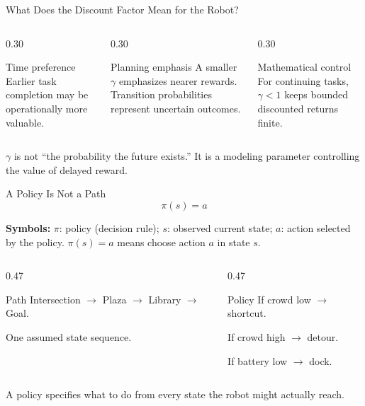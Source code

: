 \documentclass[aspectratio=169,10pt]{beamer}
\newcommand{\equationlegend}[1]{%
  \par\smallskip
  \begingroup
    \setlength{\fboxsep}{4pt}%
    \noindent\colorbox{DeckSoft}{%
      \parbox{\dimexpr\linewidth-2\fboxsep\relax}{%
        \footnotesize\textbf{Symbols:} #1%
      }%
    }\par
  \endgroup
  \smallskip
}
\begin{document}
\begin{frame}[shrink=10]{What Does the Discount Factor Mean for the Robot?}
  \begin{columns}[T,onlytextwidth]
    \begin{column}{0.30\textwidth}
      \begin{block}{Time preference}
        Earlier task completion may be operationally more valuable.
      \end{block}
    \end{column}
    \begin{column}{0.30\textwidth}
      \begin{block}{Planning emphasis}
        A smaller $\gamma$ emphasizes nearer rewards. Transition probabilities represent uncertain outcomes.
      \end{block}
    \end{column}
    \begin{column}{0.30\textwidth}
      \begin{block}{Mathematical control}
        For continuing tasks, $\gamma<1$ keeps bounded discounted returns finite.
      \end{block}
    \end{column}
  \end{columns}

  \begin{keyidea}
    $\gamma$ is not ``the probability the future exists.'' It is a modeling parameter controlling the value of delayed reward.
  \end{keyidea}
\end{frame}

\begin{frame}[shrink=10]{A Policy Is Not a Path}
  \[
    \pi(s)=a
  \]
  \equationlegend{$\pi$: policy (decision rule); $s$: observed current state; $a$: action selected by the policy. $\pi(s)=a$ means choose action $a$ in state $s$.}

  \begin{columns}[T,onlytextwidth]
    \begin{column}{0.47\textwidth}
      \begin{block}{Path}
        Intersection $\rightarrow$ Plaza $\rightarrow$ Library $\rightarrow$ Goal.

        One assumed state sequence.
      \end{block}
    \end{column}
    \begin{column}{0.47\textwidth}
      \begin{block}{Policy}
        If crowd low $\rightarrow$ shortcut.

        If crowd high $\rightarrow$ detour.

        If battery low $\rightarrow$ dock.
      \end{block}
    \end{column}
  \end{columns}

  \begin{keyidea}
    A policy specifies what to do from every state the robot might actually reach.
  \end{keyidea}
\end{frame}
\end{document}
